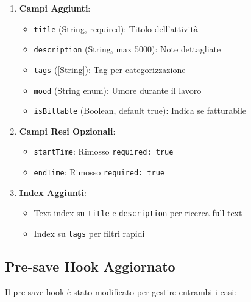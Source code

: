 \documentclass[11pt,a4paper]{article}
\begin{document}
\begin{enumerate}
    \item \textbf{Campi Aggiunti}:
    \begin{itemize}
        \item \texttt{title} (String, required): Titolo dell'attività
        \item \texttt{description} (String, max 5000): Note dettagliate
        \item \texttt{tags} ([String]): Tag per categorizzazione
        \item \texttt{mood} (String enum): Umore durante il lavoro
        \item \texttt{isBillable} (Boolean, default true): Indica se fatturabile
    \end{itemize}
    
    \item \textbf{Campi Resi Opzionali}:
    \begin{itemize}
        \item \texttt{startTime}: Rimosso \texttt{required: true}
        \item \texttt{endTime}: Rimosso \texttt{required: true}
    \end{itemize}
    
    \item \textbf{Index Aggiunti}:
    \begin{itemize}
        \item Text index su \texttt{title} e \texttt{description} per ricerca full-text
        \item Index su \texttt{tags} per filtri rapidi
    \end{itemize}
\end{enumerate}

\subsection{Pre-save Hook Aggiornato}

Il pre-save hook è stato modificato per gestire entrambi i casi:
\end{document}
